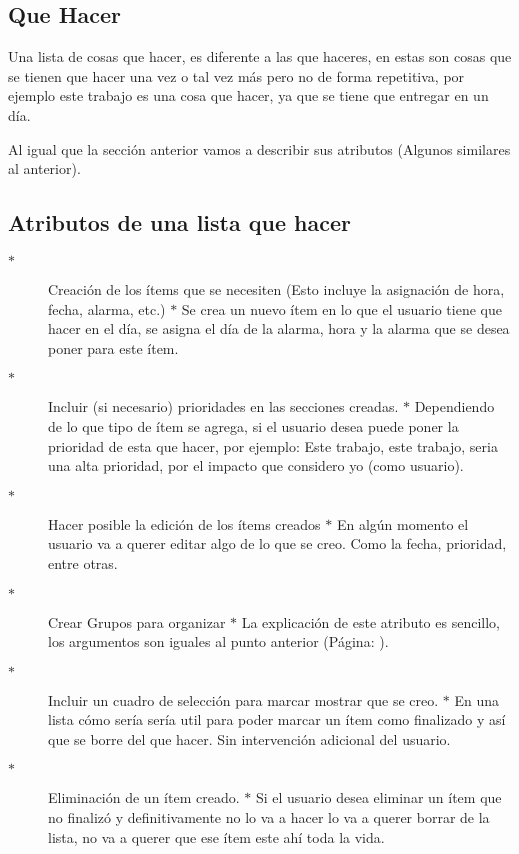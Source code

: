 \documentclass[12pt]{extreport}
\begin{document}
\begin{center}
\section*{Que Hacer}\label{sec:quehacer}
\end{center}

Una lista de cosas que hacer, es diferente a las que haceres, en estas son cosas que se tienen que hacer una vez o tal vez más pero no de forma repetitiva, por ejemplo este trabajo es una cosa que hacer, ya que se tiene que entregar en un día.

Al igual que la sección anterior vamos a describir sus atributos (Algunos similares al anterior).\\

\subsection*{Atributos de una lista que hacer}
\begin{description}
\item[$\ast$ ]Creación de los ítems que se necesiten (Esto incluye la asignación de hora, fecha, alarma, etc.)
\subitem$\ast$ Se crea un nuevo ítem en lo que el usuario tiene que hacer en el día, se asigna el día de la alarma, hora y la alarma que se desea poner para este ítem.
\item[$\ast$ ]Incluir (si necesario) prioridades en las secciones creadas.
\subitem$\ast$ Dependiendo de lo que tipo de ítem se agrega, si el usuario desea puede poner la prioridad de esta que hacer, por ejemplo: Este trabajo, este trabajo, seria una alta prioridad, por el impacto que considero yo (como usuario).
\item[$\ast$ ]Hacer posible la edición de los ítems creados
\subitem$\ast$ En algún momento el usuario va a querer editar algo de lo que se creo. Como la fecha, prioridad, entre otras.
\item[$\ast$ ]Crear Grupos para organizar
\subitem$\ast$ La explicación de este atributo es sencillo, los argumentos son iguales al punto anterior (Página: \pageref{sec:quehaceres}).
\item[$\ast$ ]Incluir un cuadro de selección para marcar mostrar que se creo.
\subitem$\ast$ En una lista cómo sería sería util para poder marcar un ítem como finalizado y así que se borre del que hacer. Sin intervención adicional del usuario.
\item[$\ast$ ]Eliminación de un ítem creado.
\subitem$\ast$ Si el usuario desea eliminar un ítem que no finalizó y definitivamente no lo va a hacer lo va a querer borrar de la lista, no va a querer que ese ítem este ahí toda la vida.
\end{description}

\end{document}

